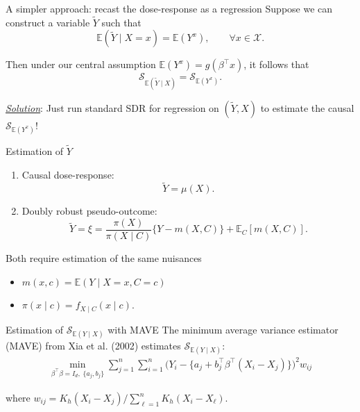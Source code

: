 \documentclass[
  ignorenonframetext,
  aspectratio=169,
  11pt]{beamer}
\providecommand{\tightlist}{%
  \setlength{\itemsep}{0pt}\setlength{\parskip}{0pt}}
\begin{document}
\begin{frame}{A simpler approach: recast the dose-response as a
regression}
\protect{}\label{a-simpler-approach-recast-the-dose-response-as-a-regression}
Suppose we can construct a variable \(\widetilde{Y}\) such that \[
\mathbb{E}(\widetilde{Y} \mid X=x) = \mathbb{E}(Y^x), \qquad \forall x\in \mathcal{X}.
\]

\pause

Then under our central assumption \(\mathbb{E}(Y^x)=g(\beta^\top x)\),
it follows that \[
\mathcal{S}_{\mathbb{E}(\widetilde{Y} \mid X)} = \mathcal{S}_{\mathbb{E}(Y^x)}. 
\]

\pause

\underline{\textit{Solution}}: Just run standard SDR for regression on
\((\widetilde{Y}, X)\) to estimate the causal
\(\mathcal{S}_{\mathbb{E}(Y^x)}\)!
\end{frame}

\begin{frame}{Estimation of \(\widetilde{Y}\)}
\protect{}\label{estimation-of-widetildey}
\begin{enumerate}
\tightlist
\item
  Causal dose-response: \[\widetilde{Y}=\mu(X).\]
\item
  Doubly robust pseudo-outcome: \[
  \widetilde{Y}=\xi=
  \frac{\pi(X)}{\pi(X\mid C)}
  \{Y-m(X,C)\}
  +\mathbb{E}_C[m(X,C)].
  \]
\end{enumerate}

Both require estimation of the same nuisances

\begin{itemize}
\tightlist
\item
  \(m(x,c)=\mathbb{E}(Y\mid X=x,C=c)\)
\item
  \(\pi(x\mid c)=f_{X\mid C}(x\mid c)\).
\end{itemize}
\end{frame}

\begin{frame}{Estimation of \(\mathcal{S}_{\mathbb{E}(Y\mid X)}\) with
MAVE}
\protect{}\label{estimation-of-mathcals_mathbbeymid-x-with-mave}
The minimum average variance estimator (MAVE) from {\color{emoryblue}Xia
et al. (2002)} estimates \(\mathcal{S}_{\mathbb{E}(Y\mid X)}\):
\begin{align*}
  \min_{\beta^\top\beta = I_d,\; \{a_j,{b}_j\}}
  \sum_{j=1}^n \sum_{i=1}^n 
  \Big(Y_i - \{a_j +   {b}_j^\top \beta^\top ({X}_i - {X}_j)\}\Big)^2 w_{ij}
\end{align*}

where \(w_{ij} = K_h(X_i-X_j) / \sum^n_{\ell=1} K_h(X_i - X_\ell)\).
\end{frame}
\end{document}
